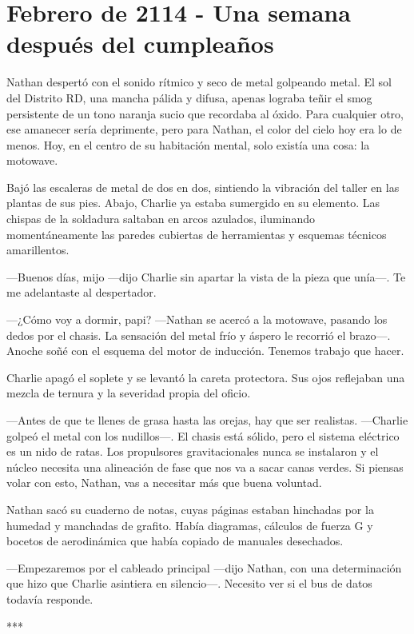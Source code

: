 \documentclass[11pt,twoside]{book}
\begin{document}
\section*{Febrero de 2114 - Una semana después del cumpleaños}

Nathan despertó con el sonido rítmico y seco de metal golpeando metal. El sol del Distrito RD, una mancha pálida y difusa, apenas lograba teñir el smog persistente de un tono naranja sucio que recordaba al óxido. Para cualquier otro, ese amanecer sería deprimente, pero para Nathan, el color del cielo hoy era lo de menos. Hoy, en el centro de su habitación mental, solo existía una cosa: la motowave.

Bajó las escaleras de metal de dos en dos, sintiendo la vibración del taller en las plantas de sus pies. Abajo, Charlie ya estaba sumergido en su elemento. Las chispas de la soldadura saltaban en arcos azulados, iluminando momentáneamente las paredes cubiertas de herramientas y esquemas técnicos amarillentos.

---Buenos días, mijo ---dijo Charlie sin apartar la vista de la pieza que unía---. Te me adelantaste al despertador.

---¿Cómo voy a dormir, papi? ---Nathan se acercó a la motowave, pasando los dedos por el chasis. La sensación del metal frío y áspero le recorrió el brazo---. Anoche soñé con el esquema del motor de inducción. Tenemos trabajo que hacer.

Charlie apagó el soplete y se levantó la careta protectora. Sus ojos reflejaban una mezcla de ternura y la severidad propia del oficio.

---Antes de que te llenes de grasa hasta las orejas, hay que ser realistas. ---Charlie golpeó el metal con los nudillos---. El chasis está sólido, pero el sistema eléctrico es un nido de ratas. Los propulsores gravitacionales nunca se instalaron y el núcleo necesita una alineación de fase que nos va a sacar canas verdes. Si piensas volar con esto, Nathan, vas a necesitar más que buena voluntad.

Nathan sacó su cuaderno de notas, cuyas páginas estaban hinchadas por la humedad y manchadas de grafito. Había diagramas, cálculos de fuerza G y bocetos de aerodinámica que había copiado de manuales desechados.

---Empezaremos por el cableado principal ---dijo Nathan, con una determinación que hizo que Charlie asintiera en silencio---. Necesito ver si el bus de datos todavía responde.

\bigskip
\begin{center}***\end{center}
\bigskip
\end{document}
